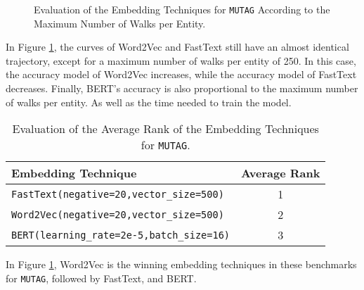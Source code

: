 \begin{figure}[!ht]
  \centering
  \caption{Evaluation of the Embedding Techniques for \texttt{MUTAG} According
    to the Maximum Number of Walks per Entity.}
  \label{fig:benchmarks:embedders:walks}
\end{figure}

In Figure \ref{fig:benchmarks:embedders:walks}, the curves of Word2Vec and
FastText still have an almost identical trajectory, except for a maximum number
of walks per entity of 250. In this case, the accuracy model of Word2Vec
increases, while the accuracy model of FastText decreases. Finally, BERT's
accuracy is also proportional to the maximum number of walks per entity. As well
as the time needed to train the model.

\newpage

\begin{table}[!ht]
  \centering
  \begin{tabular}{lc}
    \toprule
    \textbf{Embedding Technique} & \textbf{Average Rank} \\
    \midrule
    \texttt{FastText(negative=20,vector\_size=500)} & 1 \\
    \texttt{Word2Vec(negative=20,vector\_size=500)} & 2 \\
    \texttt{BERT(learning\_rate=2e-5,batch\_size=16)} & 3 \\
    \bottomrule
  \end{tabular}
  \caption{Evaluation of the Average Rank of the Embedding Techniques for \texttt{MUTAG}.}
  \label{tab:benchmark:embedders:average:rank}
\end{table}

In Figure \ref{tab:benchmark:embedders:average:rank}, Word2Vec is the winning
embedding techniques in these benchmarks for \texttt{MUTAG}, followed by
FastText, and BERT.

